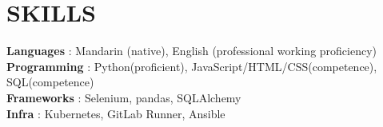 \documentclass[letterpaper,11pt]{article}
\begin{document}
%
\section{SKILLS}
 \begin{itemize}[leftmargin=0in, label={}]
    \small{\item{
     \textbf{Languages} {: Mandarin (native), English (professional working proficiency)}\vspace{2pt} \\
     \textbf{Programming} {: Python(proficient), JavaScript/HTML/CSS(competence), SQL(competence)}\vspace{2pt} \\
     \textbf{Frameworks}     {: Selenium, pandas, SQLAlchemy} \\
     \textbf{Infra}     {: Kubernetes, GitLab Runner, Ansible}
    }}
 \end{itemize}


\end{document}
